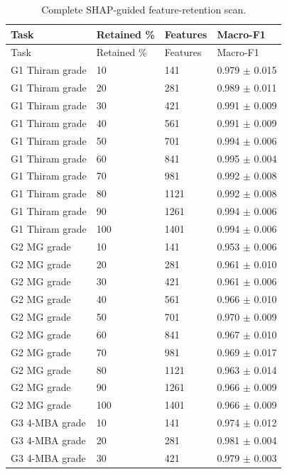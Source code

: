 {\scriptsize
\setlength{\tabcolsep}{2.5pt}
\renewcommand{\arraystretch}{1.08}
\begin{longtable}{L{4.0cm}L{2.4cm}L{2.4cm}L{4.2cm}}
\caption{Complete SHAP-guided feature-retention scan.}\label{tab:s5_feature_selection_curve}\\
\toprule
Task & Retained \% & Features & Macro-F1 \\
\midrule
\endfirsthead
\toprule
Task & Retained \% & Features & Macro-F1 \\
\midrule
\endhead
\endfoot
\bottomrule
\endlastfoot
G1 Thiram grade & 10 & 141 & 0.979 $\pm$ 0.015 \\
G1 Thiram grade & 20 & 281 & 0.989 $\pm$ 0.011 \\
G1 Thiram grade & 30 & 421 & 0.991 $\pm$ 0.009 \\
G1 Thiram grade & 40 & 561 & 0.991 $\pm$ 0.009 \\
G1 Thiram grade & 50 & 701 & 0.994 $\pm$ 0.006 \\
G1 Thiram grade & 60 & 841 & 0.995 $\pm$ 0.004 \\
G1 Thiram grade & 70 & 981 & 0.992 $\pm$ 0.008 \\
G1 Thiram grade & 80 & 1121 & 0.992 $\pm$ 0.008 \\
G1 Thiram grade & 90 & 1261 & 0.994 $\pm$ 0.006 \\
G1 Thiram grade & 100 & 1401 & 0.994 $\pm$ 0.006 \\
G2 MG grade & 10 & 141 & 0.953 $\pm$ 0.006 \\
G2 MG grade & 20 & 281 & 0.961 $\pm$ 0.010 \\
G2 MG grade & 30 & 421 & 0.961 $\pm$ 0.006 \\
G2 MG grade & 40 & 561 & 0.966 $\pm$ 0.010 \\
G2 MG grade & 50 & 701 & 0.970 $\pm$ 0.009 \\
G2 MG grade & 60 & 841 & 0.967 $\pm$ 0.010 \\
G2 MG grade & 70 & 981 & 0.969 $\pm$ 0.017 \\
G2 MG grade & 80 & 1121 & 0.963 $\pm$ 0.014 \\
G2 MG grade & 90 & 1261 & 0.966 $\pm$ 0.009 \\
G2 MG grade & 100 & 1401 & 0.966 $\pm$ 0.009 \\
G3 4-MBA grade & 10 & 141 & 0.974 $\pm$ 0.012 \\
G3 4-MBA grade & 20 & 281 & 0.981 $\pm$ 0.004 \\
G3 4-MBA grade & 30 & 421 & 0.979 $\pm$ 0.003 \\

\end{longtable}}
